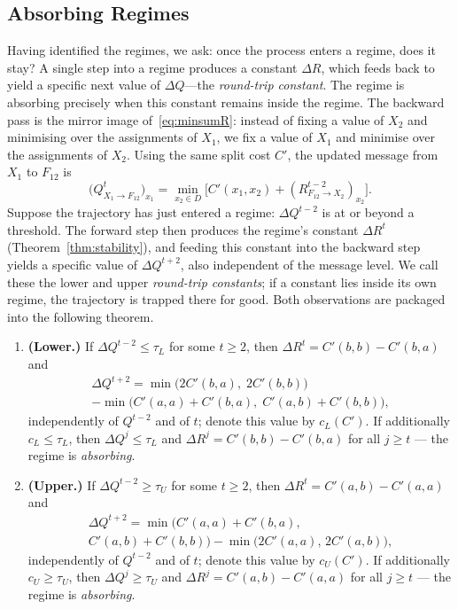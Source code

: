 \subsection{Absorbing Regimes}\label{sec:absorbing}
Having identified the regimes, we ask: once the process enters a regime, does it stay? A single step into a regime produces a constant $\Delta R$, which feeds back to yield a specific next value of $\Delta Q$—the \emph{round-trip constant}. The regime is absorbing precisely when this constant remains inside the regime.
The backward pass is the mirror image of~\eqref{eq:minsumR}: instead of fixing a value of $X_2$ and minimising over the assignments of $X_1$, we fix a value of $X_1$ and minimise over the assignments of $X_2$.  Using the same split cost $C'$, the updated message from $X_1$ to $F_{12}$ is
\begin{equation}\label{eq:minsumQ}
    \bigl(Q^t_{X_1 \to F_{12}}\bigr)_{x_1} = \min_{x_2 \in D}\bigl[C'(x_1, x_2) + (R^{t-2}_{F_{12} \to X_2})_{x_2}\bigr].
\end{equation}
Suppose the trajectory has just entered a regime: $\Delta Q^{t-2}$ is at or beyond a threshold.  The forward step then produces the regime's constant $\Delta R^t$ (Theorem~\ref{thm:stability}), and feeding this constant into the backward step yields a specific value of $\Delta Q^{t+2}$, also independent of the message level.  We call these the lower and upper \emph{round-trip constants}; if a constant lies inside its own regime, the trajectory is trapped there for good.  Both observations are packaged into the following theorem.
\begin{theorem}\label{thm:absorbing}
\begin{enumerate}
\item \textbf{(Lower.)}  If $\Delta Q^{t-2} \leq \tau_L$ for some $t \geq 2$, then $\Delta R^t = C'(b,b) - C'(b,a)$ and
\begin{multline}\label{eq:cL}
    \Delta Q^{t+2}
    = \min\!\bigl(2C'(b,a),\;2C'(b,b)\bigr) \\
    - \min\!\bigl(C'(a,a)+C'(b,a),\;C'(a,b)+C'(b,b)\bigr),
\end{multline}
independently of $Q^{t-2}$ and of $t$; denote this value by $c_L(C')$.  If additionally $c_L \leq \tau_L$, then $\Delta Q^j \leq \tau_L$ and $\Delta R^j = C'(b,b) - C'(b,a)$ for all $j \geq t$ --- the regime is \emph{absorbing}.
\item \textbf{(Upper.)}  If $\Delta Q^{t-2} \geq \tau_U$ for some $t \geq 2$, then $\Delta R^t = C'(a,b) - C'(a,a)$ and
\begin{multline}\label{eq:cU}
    \Delta Q^{t+2}
    = \min\!\bigl(C'(a,a)+C'(b,a), \\
    C'(a,b)+C'(b,b)\bigr)
    - \min\!\bigl(2C'(a,a),\,2C'(a,b)\bigr),
\end{multline}
independently of $Q^{t-2}$ and of $t$; denote this value by $c_U(C')$.  If additionally $c_U \geq \tau_U$, then $\Delta Q^j \geq \tau_U$ and $\Delta R^j = C'(a,b) - C'(a,a)$ for all $j \geq t$ --- the regime is \emph{absorbing}.
\end{enumerate}
\end{theorem}

